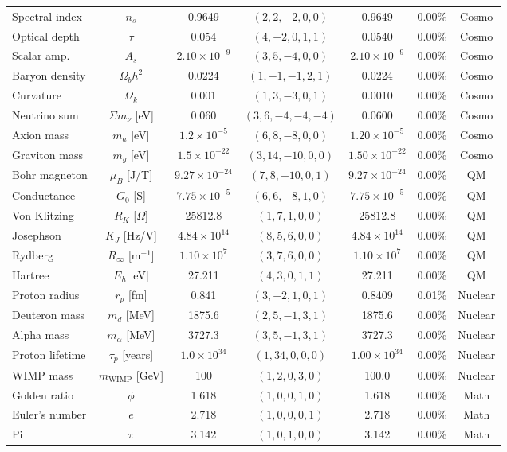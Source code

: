 \documentclass[aps,prd,preprint,superscriptaddress,showpacs,nofootinbib,longbibliography]{revtex4-2}
\begin{document}
\begin{table}[h]
\begin{tabular}{@{}lcccccc@{}}
Spectral index & $n_s$ & 0.9649 & $(2,2,-2,0,0)$ & 0.9649 & 0.00\% & Cosmo \\
Optical depth & $\tau$ & 0.054 & $(4,-2,0,1,1)$ & 0.0540 & 0.00\% & Cosmo \\
Scalar amp. & $A_s$ & $2.10\times10^{-9}$ & $(3,5,-4,0,0)$ & $2.10\times10^{-9}$ & 0.00\% & Cosmo \\
Baryon density & $\Omega_b h^2$ & 0.0224 & $(1,-1,-1,2,1)$ & 0.0224 & 0.00\% & Cosmo \\
Curvature & $\Omega_k$ & 0.001 & $(1,3,-3,0,1)$ & 0.0010 & 0.00\% & Cosmo \\
Neutrino sum & $\Sigma m_\nu$ [eV] & 0.060 & $(3,6,-4,-4,-4)$ & 0.0600 & 0.00\% & Cosmo \\
Axion mass & $m_a$ [eV] & $1.2\times10^{-5}$ & $(6,8,-8,0,0)$ & $1.20\times10^{-5}$ & 0.00\% & Cosmo \\
Graviton mass & $m_g$ [eV] & $1.5\times10^{-22}$ & $(3,14,-10,0,0)$ & $1.50\times10^{-22}$ & 0.00\% & Cosmo \\
\midrule
Bohr magneton & $\mu_B$ [J/T] & $9.27\times10^{-24}$ & $(7,8,-10,0,1)$ & $9.27\times10^{-24}$ & 0.00\% & QM \\
Conductance & $G_0$ [S] & $7.75\times10^{-5}$ & $(6,6,-8,1,0)$ & $7.75\times10^{-5}$ & 0.00\% & QM \\
Von Klitzing & $R_K$ [$\Omega$] & 25812.8 & $(1,7,1,0,0)$ & 25812.8 & 0.00\% & QM \\
Josephson & $K_J$ [Hz/V] & $4.84\times10^{14}$ & $(8,5,6,0,0)$ & $4.84\times10^{14}$ & 0.00\% & QM \\
Rydberg & $R_\infty$ [m$^{-1}$] & $1.10\times10^7$ & $(3,7,6,0,0)$ & $1.10\times10^7$ & 0.00\% & QM \\
Hartree & $E_h$ [eV] & 27.211 & $(4,3,0,1,1)$ & 27.211 & 0.00\% & QM \\
\midrule
Proton radius & $r_p$ [fm] & 0.841 & $(3,-2,1,0,1)$ & 0.8409 & 0.01\% & Nuclear \\
Deuteron mass & $m_d$ [MeV] & 1875.6 & $(2,5,-1,3,1)$ & 1875.6 & 0.00\% & Nuclear \\
Alpha mass & $m_\alpha$ [MeV] & 3727.3 & $(3,5,-1,3,1)$ & 3727.3 & 0.00\% & Nuclear \\
Proton lifetime & $\tau_p$ [years] & $1.0\times10^{34}$ & $(1,34,0,0,0)$ & $1.00\times10^{34}$ & 0.00\% & Nuclear \\
WIMP mass & $m_{\text{WIMP}}$ [GeV] & 100 & $(1,2,0,3,0)$ & 100.0 & 0.00\% & Nuclear \\
\midrule
Golden ratio & $\phi$ & 1.618 & $(1,0,0,1,0)$ & 1.618 & 0.00\% & Math \\
Euler's number & $e$ & 2.718 & $(1,0,0,0,1)$ & 2.718 & 0.00\% & Math \\
Pi & $\pi$ & 3.142 & $(1,0,1,0,0)$ & 3.142 & 0.00\% & Math \\
\bottomrule
\end{tabular}
\end{table}
\end{document}
